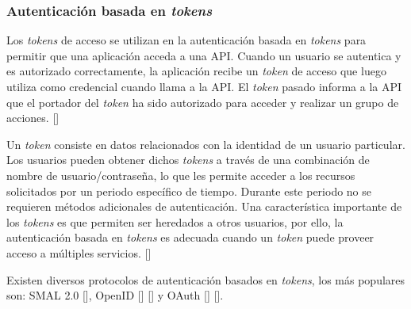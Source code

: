 
\subsubsection{Autenticación basada en \textit{tokens}}

Los \textit{tokens} de acceso se utilizan en la autenticación basada en \textit{tokens} para permitir que una aplicación acceda a una API. Cuando un usuario se autentica y es autorizado correctamente, la aplicación recibe un \textit{token} de acceso que luego utiliza como credencial cuando llama a la API. El \textit{token} pasado informa a la API que el portador del \textit{token} ha sido autorizado para acceder y realizar un grupo de acciones. [\cite{auth0AccessTokens}]


Un \textit{token} consiste en datos relacionados con la identidad de un usuario particular. Los usuarios pueden obtener dichos \textit{tokens} a través de una combinación de nombre de usuario/contraseña, lo que les permite acceder a los recursos solicitados por un periodo específico de tiempo. Durante este periodo no se requieren métodos adicionales de autenticación. Una característica importante de los \textit{tokens} es que permiten ser heredados a otros usuarios, por ello, la autenticación basada en \textit{tokens} es adecuada cuando un \textit{token} puede proveer acceso a múltiples servicios. [\cite{banerjee2018token}] %

Existen diversos protocolos de autenticación basados en \textit{tokens}, los más populares son: SMAL 2.0 [\cite{cantor2005assertions}], OpenID [\cite{recordon2006openid}] [\cite{mainka2017sok}] y OAuth [\cite{hardt2012oauth}] [\cite{richer2017oauth}]. 


